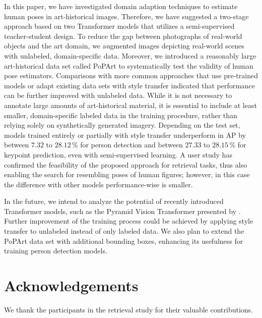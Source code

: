 \documentclass[sigconf]{acmart}
\begin{document}
In this paper, we have investigated domain adaption techniques to estimate human poses in art-historical images. 
Therefore, we have suggested a two-stage approach based on two Transformer models that utilizes a semi-supervised teacher-student design. 
To reduce the gap between photographs of real-world objects and the art domain, we augmented images depicting real-world scenes with unlabeled, domain-specific data. 
Moreover, we introduced a reasonably large art-historical data set called \acf{PoPArt} to systematically test the validity of human pose estimators. 
Comparisons with more common approaches that use pre-trained models or adapt existing data sets with style transfer indicated that performance can be further improved with unlabeled data. 
While it is not necessary to annotate large amounts of art-historical material, it is essential to include at least smaller, domain-specific labeled data in the training procedure, rather than relying solely on synthetically generated imagery. 
Depending on the test set, models trained entirely or partially with style transfer underperform in \acl{AP} by between $7.32$ to $28.12$\,\% for person detection and between $27.33$ to $28.15$\,\% for keypoint prediction, even with semi-supervised learning. 
A user study has confirmed the feasibility of the proposed approach for retrieval tasks, thus also enabling the search for resembling poses of human figures; however, in this case the difference with other models performance-wise is smaller.

In the future, we intend to analyze the potential of recently introduced Transformer models, such as the Pyramid Vision Transformer presented by \citet{DBLP:journals/corr/abs-2106-13797}. Further improvement of the training process could be achieved by applying style transfer to unlabeled instead of only labeled data. We also plan to extend the \ac{PoPArt} data set with additional bounding boxes, enhancing its usefulness for training person detection models.


\section*{Acknowledgements}

We thank the participants in the retrieval study for their valuable contributions.


\clearpage

\balance

\balance

\clearpage
\onecolumn
\setcounter{section}{0}
\end{document}
